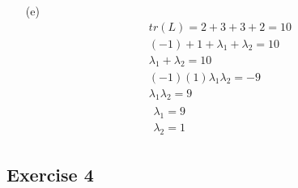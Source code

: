 \documentclass{article}
\begin{document}
\begin{enumerate}
  \item[(e)]
  \begin{gather*}
    tr(L) = 2 + 3 + 3 + 2 = 10 \\
    (-1) + 1 + \lambda_1 + \lambda_2 = 10 \\
    \lambda_1 + \lambda_2 = 10 \\
    (-1)(1)\lambda_1 \lambda_2 = -9 \\
    \lambda_1 \lambda_2 = 9 \\
    \boxed{
      \begin{split}
        \lambda_1 = 9 \\
        \lambda_2 = 1
      \end{split}
    }
  \end{gather*}
\end{enumerate}

\newpage

\subsection*{Exercise 4}
\end{document}
